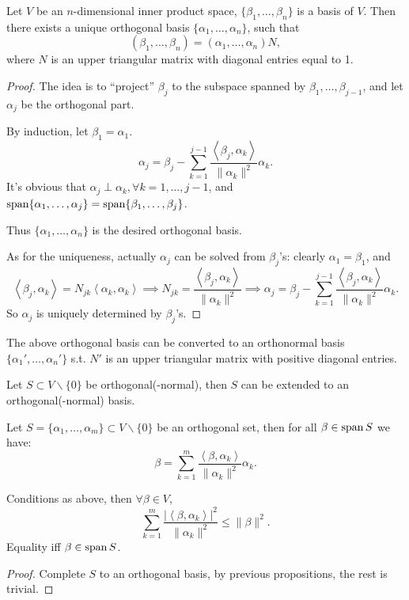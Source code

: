 \begin{theorem}
    Let $V$ be an $n$-dimensional inner product space, $\{\beta_1,\dots,\beta_n\}$
	is a basis of $V$.
	Then there exists a unique orthogonal basis $\{\alpha_1,\dots,\alpha_n\}$,
	such that
	\[
		(\beta_1,\dots,\beta_n) = (\alpha_1,\dots,\alpha_n)N,
	\]
	where $N$ is an upper triangular matrix with diagonal entries equal to 1.
\end{theorem}
\begin{proof}[Proof]
    The idea is to ``project'' $\beta_j$ to the subspace spanned
	by $\beta_1,\dots,\beta_{j-1}$, and let $\alpha_j$ be the orthogonal part.

	By induction, let $\beta_1 = \alpha_1$.
	\[
	\alpha_j = \beta_j - \sum_{k=1}^{j-1} \frac{\left<\beta_j, \alpha_k\right>}
	{\lVert \alpha_k \rVert ^2}\alpha_k.
	\]
	It's obvious that $\alpha_j \perp \alpha_k, \forall k=1,\dots,j-1$,
	and $\operatorname{span}\{\alpha_1,\dots,\alpha_j\} = \operatorname{span}\{\beta_1,\dots,\beta_j\}$.

	Thus $\{\alpha_1,\dots,\alpha_n\}$ is the desired orthogonal basis.

	As for the uniqueness, actually $\alpha_j$ can be solved from $\beta_j$'s:
	clearly $\alpha_1 = \beta_1$, and
	\[
	\left<\beta_j, \alpha_k \right> = N_{jk} \left<\alpha_k, \alpha_k \right>
	\implies N_{jk} =
	\frac{\left<\beta_j, \alpha_k \right>}{\lVert \alpha_k \rVert^2}\implies
	\alpha_j = \beta_j - \sum_{k=1}^{j-1} \frac{\left<\beta_j, \alpha_k\right>}
	{\lVert \alpha_k \rVert ^2}\alpha_k.
	\]
	So $\alpha_j$ is uniquely determined by $\beta_j$'s.
\end{proof}
\begin{remark}
    The above orthogonal basis can be converted to an orthonormal basis
	$\{\alpha_1',\dots,\alpha_n'\}$ s.t. $N'$ is an upper triangular
	matrix with positive diagonal entries.
\end{remark}

\begin{corollary}
    Let $S \subset V\backslash\{0\}$ be orthogonal(-normal), then
	$S$ can be extended to an orthogonal(-normal) basis.
\end{corollary}
\begin{proposition}
	Let $S = \{\alpha_1,\dots,\alpha_m\} \subset V\backslash\{0\}$ be
	an orthogonal set, then for all $\beta\in \operatorname{span} S$ we have:
	\[
	\beta = \sum_{k=1}^{m} \frac{\left<\beta, \alpha_k\right>}
	{\lVert \alpha_k \rVert ^2}\alpha_k.
	\]
\end{proposition}
\begin{proposition}
	Conditions as above, then $\forall \beta\in V$,
	\[
	\sum_{k=1}^{m} \frac{|\left<\beta,\alpha_k\right>|^2}{\lVert \alpha_k \rVert ^2}
	\le \lVert \beta \rVert ^2.
	\]
	Equality iff $\beta\in \operatorname{span} S$.
\end{proposition}
\begin{proof}[Proof]
    Complete $S$ to an orthogonal basis, by previous propositions,
	the rest is trivial.
\end{proof}

